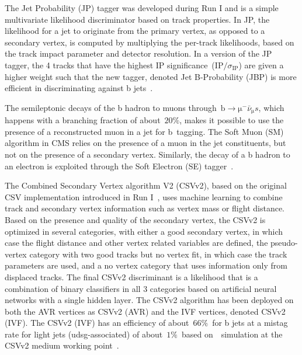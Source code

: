 The Jet Probability (JP) tagger was developed during Run I and is a simple multivariate likelihood discriminator based on track properties. In JP, the likelihood for a jet to originate from the primary vertex, as opposed to a secondary vertex, is computed by multiplying the per-track likelihoods, based on the track impact parameter and detector resolution. In a version of the JP tagger, the 4 tracks that have the highest IP significance~($\mathrm{IP} / \sigma_{\mathrm{IP}}$) are given a higher weight such that the new tagger, denoted Jet B-Probability (JBP) is more efficient in discriminating against b jets~\cite{Chatrchyan:2012jua}.

The semileptonic decays of the b hadron to muons through~$\mathrm{b} \rightarrow \mathrm{\mu}^- \bar{\nu}_{\mathrm{\mu}} s$, which happens with a branching fraction of about~$20\%$, makes it possible to use the presence of a reconstructed muon in a jet for b~tagging. The Soft Muon (SM) algorithm in CMS relies on the presence of a muon in the jet constituents, but not on the presence of a secondary vertex. Similarly, the decay of a b hadron to an electron is exploited through the Soft Electron (SE) tagger~\cite{CMS-PAS-BTV-15-001}. 

The Combined Secondary Vertex algorithm V2 (CSVv2), based on the original CSV implementation introduced in Run I~\cite{Chatrchyan:2012jua}, uses machine learning to combine track and secondary vertex information such as vertex mass or flight distance. Based on the presence and quality of the secondary vertex, the CSVv2 is optimized in several categories, with either a good secondary vertex, in which case the flight distance and other vertex related variables are defined, the pseudo-vertex category with two good tracks but no vertex fit, in which case the track parameters are used, and a no vertex category that uses information only from displaced tracks. The final CSVv2 discriminant is a likelihood that is a combination of binary classifiers in all 3 categories based on artificial neural networks with a single hidden layer. The CSVv2 algorithm has been deployed on both the AVR vertices as CSVv2 (AVR) and the IVF vertices, denoted CSVv2 (IVF). The CSVv2 (IVF) has an efficiency of about~$66\%$~for b jets at a mistag rate for light jets (udsg-associated) of about~$1\%$~based on~\ttbar~simulation at the CSVv2 medium working point~\cite{CMS-PAS-BTV-15-001}.


